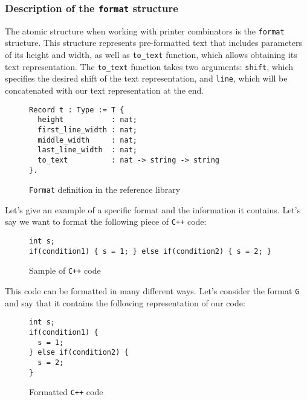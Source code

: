 \documentclass[14pt]{constructor-diploma}
\begin{document}
\subsubsection{Description of the \texttt{format} structure}
The atomic structure when working with printer combinators is the \texttt{format} structure. 
This structure represents pre-formatted text that includes parameters of its height and width, as well as \texttt{to\_text} function, 
which allows obtaining its text representation. The \texttt{to\_text} function takes two arguments: 
\texttt{shift}, which specifies the desired shift of the text representation, and \texttt{line}, 
which will be concatenated with our text representation at the end.

\begin{figure}[H]

\begin{mdframed}[backgroundcolor=bg]
\begin{verbatim}
Record t : Type := T {
  height           : nat;
  first_line_width : nat;
  middle_width     : nat;
  last_line_width  : nat;
  to_text          : nat -> string -> string
}.
\end{verbatim}
\end{mdframed}
\caption{\texttt{Format} definition in the reference library~\cite{korolihin}}
\end{figure}

Let's give an example of a specific format and the information it contains. 
Let's say we want to format the following piece of \texttt{C++} code:

\begin{figure}[H]

\begin{mdframed}[backgroundcolor=bg]
\begin{verbatim}
int s;
if(condition1) { s = 1; } else if(condition2) { s = 2; }
\end{verbatim}
\end{mdframed}
\caption{Sample of \texttt{C++} code}
\end{figure}

This code can be formatted in many different ways. 
Let's consider the format \texttt{G} and say that it contains the following representation of our code:

\begin{figure}[H]

\begin{mdframed}[backgroundcolor=bg]
\begin{verbatim}
int s;
if(condition1) { 
  s = 1; 
} else if(condition2) { 
  s = 2; 
}
\end{verbatim}
\end{mdframed}
\caption{Formatted \texttt{C++} code}
\end{figure}
\end{document}
